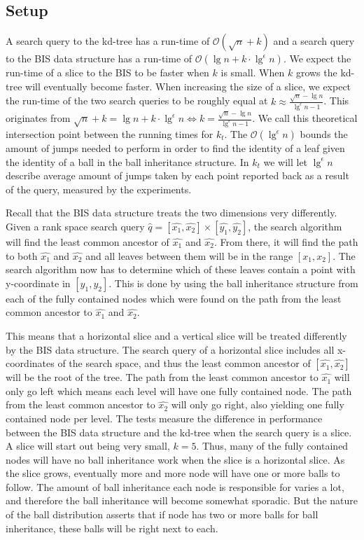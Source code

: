 \subsection{Setup}

A search query to the kd-tree has a run-time of $\mathcal{O}(\sqrt{n}+k)$ and a search query to the BIS data structure has a run-time of $\mathcal{O}(\lg n + k \cdot \lg^\epsilon n)$. We expect the run-time of a slice to the BIS to be faster when $k$ is small. When $k$ grows the kd-tree will eventually become faster. When increasing the size of a slice, we expect the run-time of the two search queries to be roughly equal at $k \approx \frac{\sqrt{n} - \lg n}{\lg^\epsilon n - 1}$. This originates from $\sqrt{n} + k = \lg n + k \cdot \lg^\epsilon n \Leftrightarrow k = \frac{\sqrt{n} - \lg n}{\lg^\epsilon n - 1}$. We call this theoretical intersection point between the running times for $k_t$. The $\mathcal{O}(\lg^\epsilon n)$ bounds the amount of jumps needed to perform in order to find the identity of a leaf given the identity of a ball in the ball inheritance structure. In $k_t$ we will let $\lg^\epsilon n$ describe average amount of jumps taken by each point reported back as a result of the query, measured by the experiments.

Recall that the BIS data structure treats the two dimensions very differently. Given a rank space search query $\hat{q} = [\hat{x_1}, \hat{x_2}] \times [\hat{y_1}, \hat{y_2}]$, the search algorithm will find the least common ancestor of $\hat{x_1}$ and $\hat{x_2}$. From there, it will find the path to both $\hat{x_1}$ and $\hat{x_2}$ and all leaves between them will be in the range $[x_1, x_2]$. The search algorithm now has to determine which of these leaves contain a point with y-coordinate in $[y_1, y_2]$. This is done by using the ball inheritance structure from each of the fully contained nodes which were found on the path from the least common ancestor to $\hat{x_1}$ and $\hat{x_2}$.

This means that a horizontal slice and a vertical slice will be treated differently by the BIS data structure. The search query of a horizontal slice includes all x-coordinates of the search space, and thus the least common ancestor of $[\hat{x_1}, \hat{x_2}]$ will be the root of the tree. The path from the least common ancestor to $\hat{x_1}$ will only go left which means each level will have one fully contained node. The path from the least common ancestor to $\hat{x_2}$ will only go right, also yielding one fully contained node per level. The tests measure the difference in performance between the BIS data structure and the kd-tree when the search query is a slice. A slice will start out being very small, $k=5$. Thus, many of the fully contained nodes will have no ball inheritance work when the slice is a horizontal slice. As the slice grows, eventually more and more node will have one or more balls to follow. The amount of ball inheritance each node is responsible for varies a lot, and therefore the ball inheritance will become somewhat sporadic. But the nature of the ball distribution asserts that if node has two or more balls for ball inheritance, these balls will be right next to each.

